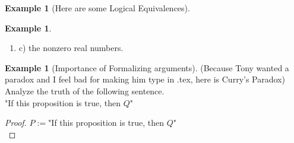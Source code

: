 \documentclass[letterpaper,10pt]{article}
\theoremstyle{plain}
\theoremstyle{definition}
\newtheorem{exmp}[thm]{Example}
\theoremstyle{remark}
\providecommand{\land}{\ensuremath{\wedge}}
\providecommand{\lor}{\ensuremath{\vee}}
\begin{document}
\begin{exmp}[Here are some Logical Equivalences]
\begin{exmp}
\begin{enumerate}
\begin{proof}
\end{proof}
\noindent
\item c) the nonzero real numbers.
\vspace{3cm}
\newline
\end{enumerate}
\end{exmp}
\vspace{3cm}

\begin{exmp}[Importance of Formalizing arguments]
(Because Tony wanted a paradox and I feel bad for making him type in .tex, here is Curry's Paradox)\\

Analyze the truth of the following sentence.\\

"If this proposition is true, then $Q$"\\
\begin{proof}
$P:=$"If this proposition is true, then $Q$"\\

\end{proof}






\end{exmp}









\end{exmp}
\end{document}
